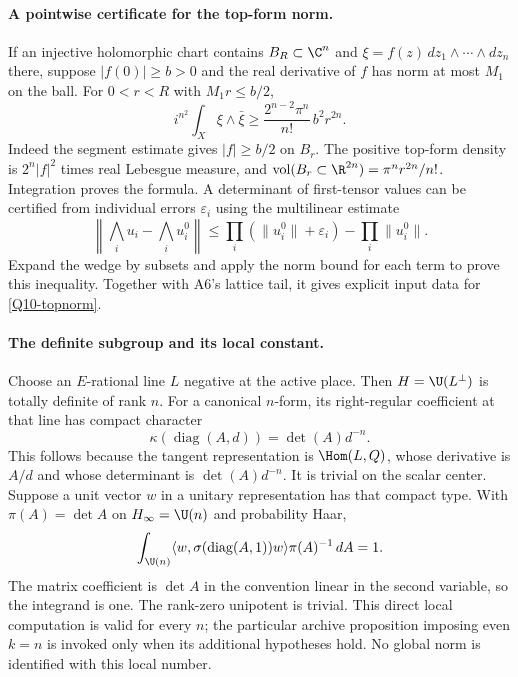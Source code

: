 \paragraph{A pointwise certificate for the top-form norm.}
If an injective holomorphic chart contains $B_R\subset\C^n$ and
$\xi=f(z)\,dz_1\wedge\cdots\wedge dz_n$ there, suppose
$|f(0)|\geq b>0$ and the real derivative of $f$ has norm at most
$M_1$ on the ball. For $0<r<R$ with $M_1r\leq b/2$,
\begin{equation}\label{Q10-topnorm}
 i^{n^2}\int_X\xi\wedge\bar\xi
       \geq \frac{2^{n-2}\pi^n}{n!}\,b^2r^{2n}.
\end{equation}
Indeed the segment estimate gives $|f|\geq b/2$ on $B_r$.
The positive top-form density is $2^n|f|^2$ times real
Lebesgue measure, and
$\operatorname{vol}(B_r\subset\R^{2n})=\pi^nr^{2n}/n!$.
Integration proves the formula. A determinant of first-tensor
values can be certified from individual errors $\varepsilon_i$
using the multilinear estimate
\[
 \left\|\bigwedge_i u_i-\bigwedge_i u_i^0\right\|
 \leq\prod_i(\|u_i^0\|+\varepsilon_i)-\prod_i\|u_i^0\|.
\]
Expand the wedge by subsets and apply the norm bound for each
term to prove this inequality. Together with A6's lattice tail,
it gives explicit input data for \eqref{Q10-topnorm}.

\paragraph{The definite subgroup and its local constant.}
Choose an $E$-rational line $L$ negative at the active place.
Then $H=\U(L^\perp)$ is totally definite of rank $n$. For a
canonical $n$-form, its right-regular coefficient at that line
has compact character
\[
 \kappa(\operatorname{diag}(A,d))=\det(A)d^{-n}.
\]
This follows because the tangent representation is
$\Hom(L,Q)$, whose derivative is $A/d$ and whose determinant
is $\det(A)d^{-n}$. It is trivial on the scalar center.
Suppose a unit vector $w$ in a unitary representation has that
compact type. With $\pi(A)=\det A$ on $H_\infty=\U(n)$ and
probability Haar,
\[
 \int_{\U(n)}
   \langle w,\sigma(\operatorname{diag}(A,1))w\rangle
                      \pi(A)^{-1}\,dA=1.
\]
The matrix coefficient is $\det A$ in the convention linear
in the second variable, so the integrand is one. The rank-zero
unipotent is trivial. This direct local computation is valid
for every $n$; the particular archive proposition imposing
even $k=n$ is invoked only when its additional hypotheses hold.
No global norm is identified with this local number.


